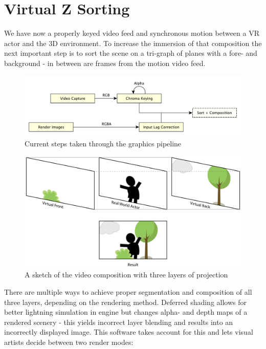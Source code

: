 %
\section{Virtual Z Sorting}

We have now a properly keyed video feed and synchronous motion between a VR 
actor and the 3D environment. To increase the immersion of that composition the 
next important step is to sort the scene on a tri-graph of planes with a fore- 
and background - in between are frames from the motion video feed.

\begin{figure}[htb]
	\includegraphics[width=\textwidth]{_raw_resources/pipeline_steps/4_5_composition.pdf}
	\caption{Current steps taken through the graphics pipeline}
	\label{fig:steps:composition}
\end{figure}

\begin{figure}[htb]
	\includegraphics[width=\textwidth]{gfx/tri-graph.png}
	\caption{A sketch of the video composition with three layers of projection}
	\label{fig:zsort:sketch}
\end{figure}

There are multiple ways to achieve proper segmentation and composition of all 
three layers, depending on the rendering method. Deferred shading allows for 
better lightning simulation in engine but changes alpha- and depth maps of a 
rendered scenery - this yields incorrect layer blending and results into an 
incorrectly displayed image. This software takes account for this and lets 
visual artists decide between two render modes:

